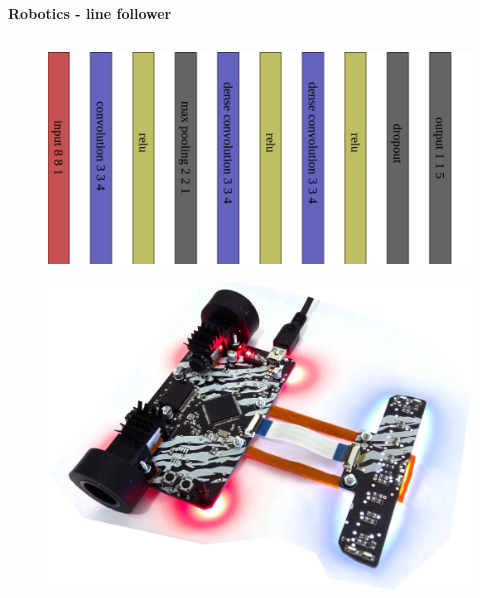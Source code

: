 \documentclass[xcolor=dvipsnames]{beamer}
\begin{document}
\begin{frame}{\bf Robotics - line follower}
\begin{columns}
    \begin{column}{0.5\textwidth}  %

        \begin{figure}
          \includegraphics[scale=0.18]{../../diagrams/line_following_net.png}
        \end{figure}

        \begin{figure}
          \includegraphics[scale=0.04]{../../pictures/robot_ascender.jpg}
        \end{figure}

    \end{column}

\end{columns}


\end{frame}
\end{document}
